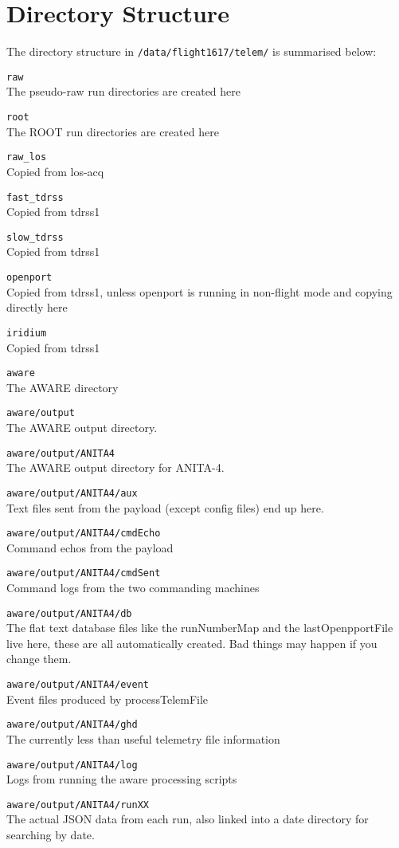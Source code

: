 \documentclass{article}
\begin{document}
\section{Directory Structure}
The directory structure in {\tt /data/flight1617/telem/} is summarised below:
\begin{description}
\item{{\tt raw}} \\The pseudo-raw run directories are created here
\item{{\tt root}} \\The ROOT run directories are created here
\item{{\tt raw\_los}} \\Copied from los-acq
\item{{\tt fast\_tdrss}} \\Copied from tdrss1
\item{{\tt slow\_tdrss}} \\Copied from tdrss1
\item{{\tt openport}} \\Copied from tdrss1, unless openport is running in non-flight mode and copying directly here
\item{{\tt iridium}} \\Copied from tdrss1
\item{{\tt aware}} \\The AWARE directory
\item{{\tt aware/output}} \\The AWARE output directory.
\item{{\tt aware/output/ANITA4}} \\The AWARE output directory for ANITA-4.
\item{{\tt aware/output/ANITA4/aux}} \\Text files sent from the payload (except config files) end up here.
\item{{\tt aware/output/ANITA4/cmdEcho}}\\ Command echos from the payload
\item{{\tt aware/output/ANITA4/cmdSent}} \\Command logs from the two commanding machines
\item{{\tt aware/output/ANITA4/db}} \\The flat text database files like the runNumberMap and the lastOpenpportFile live here, these are all automatically created. Bad things may happen if you change them.
\item{{\tt aware/output/ANITA4/event}} \\Event files produced by processTelemFile
\item{{\tt aware/output/ANITA4/ghd}} \\The currently less than useful telemetry file information
\item{{\tt aware/output/ANITA4/log}} \\Logs from running the aware processing scripts
\item{{\tt aware/output/ANITA4/runXX}} \\The actual JSON data from each run, also linked into a date directory for searching by date.
\end{description}
\end{document}
